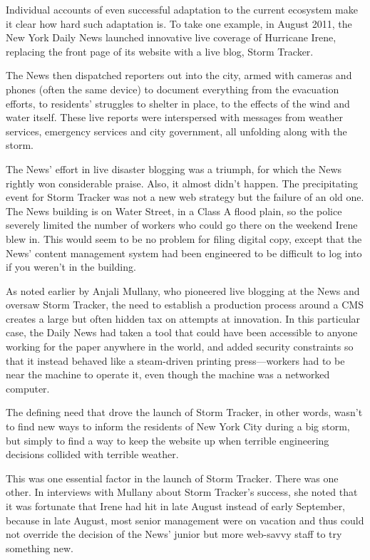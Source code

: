 Individual accounts of even successful adaptation to the current ecosystem make
it clear how hard such adaptation is. To take one example, in August 2011, the
New York Daily News launched innovative live coverage of Hurricane Irene,
replacing the front page of its website with a live blog, Storm Tracker.

The News then dispatched reporters out into the city, armed with cameras
and phones (often the same device) to document everything from the evacuation
efforts, to residents’ struggles to shelter in place, to the effects of the
wind and water itself. These live reports were interspersed with messages from
weather services, emergency services and city government, all unfolding along
with the storm.

The News’ effort in live disaster blogging was a triumph, for which the News
rightly won considerable praise. Also, it almost didn’t happen. The precipitating
event for Storm Tracker was not a new web strategy but the failure of an old
one. The News building is on Water Street, in a Class A flood plain, so the police
severely limited the number of workers who could go there on the weekend
Irene blew in. This would seem to be no problem for filing digital copy, except
that the News’ content management system had been engineered to be difficult
to log into if you weren’t in the building.

As noted earlier by Anjali Mullany, who pioneered live blogging at the News
and oversaw Storm Tracker, the need to establish a production process around
a CMS creates a large but often hidden tax on attempts at innovation. In this particular case, the Daily News had taken a tool that could have been accessible
to anyone working for the paper anywhere in the world, and added security
constraints so that it instead behaved like a steam-driven printing press—workers
had to be near the machine to operate it, even though the machine was a
networked computer.

The defining need that drove the launch of Storm Tracker, in other words, wasn’t
to find new ways to inform the residents of New York City during a big storm,
but simply to find a way to keep the website up when terrible engineering decisions
collided with terrible weather.

This was one essential factor in the launch of Storm Tracker. There was one
other. In interviews with Mullany about Storm Tracker’s success, she noted that
it was fortunate that Irene had hit in late August instead of early September,
because in late August, most senior management were on vacation and thus
could not override the decision of the News’ junior but more web-savvy staff
to try something new.

